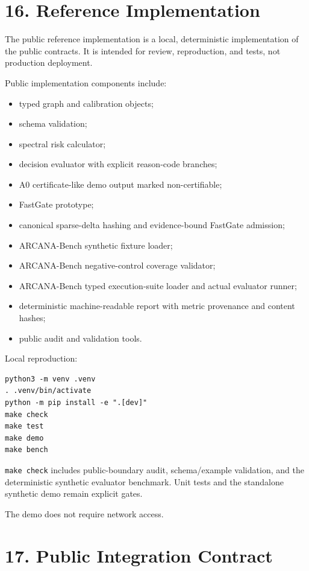 \documentclass[
  american,
  a4paper,
  10pt]{article}
\providecommand{\tightlist}{%
  \setlength{\itemsep}{0pt}\setlength{\parskip}{0pt}}
\begin{document}
\section{16. Reference Implementation}\label{16-reference-implementation}

The public reference implementation is a local, deterministic implementation of the
public contracts. It is intended for review, reproduction, and tests, not production
deployment.

Public implementation components include:

\begin{itemize}
\tightlist
\item
  typed graph and calibration objects;
\item
  schema validation;
\item
  spectral risk calculator;
\item
  decision evaluator with explicit reason-code branches;
\item
  A0 certificate-like demo output marked non-certifiable;
\item
  FastGate prototype;
\item
  canonical sparse-delta hashing and evidence-bound FastGate admission;
\item
  ARCANA-Bench synthetic fixture loader;
\item
  ARCANA-Bench negative-control coverage validator;
\item
  ARCANA-Bench typed execution-suite loader and actual evaluator runner;
\item
  deterministic machine-readable report with metric provenance and content hashes;
\item
  public audit and validation tools.
\end{itemize}

Local reproduction:

\begin{Verbatim}[breaklines=true,breakanywhere=true,fontsize=\small]
python3 -m venv .venv
. .venv/bin/activate
python -m pip install -e ".[dev]"
make check
make test
make demo
make bench
\end{Verbatim}

\texttt{make\ check} includes public-boundary audit, schema/example validation, and the
deterministic synthetic evaluator benchmark. Unit tests and the standalone synthetic
demo remain explicit gates.

The demo does not require network access.

\section{17. Public Integration Contract}\label{17-public-integration-contract}
\end{document}
